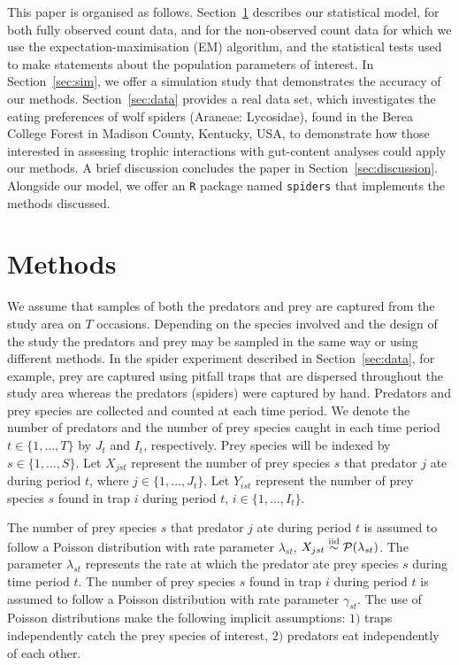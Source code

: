 \documentclass[12pt]{article}
\begin{document}
This paper is organised as follows.  Section~\ref{sec:methods} describes our statistical model, for both fully observed count data, and for the non-observed count data for which we use the expectation-maximisation (EM) algorithm, and the statistical tests used to make statements about the population parameters of interest.  In Section~\ref{sec:sim}, we offer a simulation study that demonstrates the accuracy of our methods.  Section~\ref{sec:data} provides a real data set, which investigates the eating preferences of wolf spiders (Araneae: Lycosidae), found in the Berea College Forest in Madison County, Kentucky, USA, to demonstrate how those interested in assessing trophic interactions with gut-content analyses could apply our methods.  A brief discussion concludes the paper in Section~\ref{sec:discussion}.  Alongside our model, we offer an \texttt{R} \citep{Core-Team:2014} package named \texttt{spiders} that implements the methods discussed.  

\section{Methods}
\label{sec:methods}

We assume that samples of both the predators and prey are captured from the study area on $T$ occasions.  Depending on the species involved and the design of the study the predators and prey may be sampled in the same way or using different methods.  In the spider experiment described in Section~\ref{sec:data}, for example, prey are captured using pitfall traps that are dispersed throughout the study area whereas the predators (spiders) were captured by hand.  Predators and prey species are collected and counted at each time period.  We denote the number of predators and the number of prey species caught in each time period $t \in \{1, \ldots, T\}$ by $J_t$ and $I_t$, respectively.  Prey species will be indexed by $s \in \{1, \ldots, S \}$.  Let $X_{jst}$ represent the number of prey species $s$ that predator $j$ ate during period $t$, where $j \in \{1, \ldots, J_t\}$.  Let $Y_{ist}$ represent the number of prey species $s$ found in trap $i$ during period $t$, $i \in \{1, \ldots, I_t\}$.

The number of prey species $s$ that predator $j$ ate during period $t$ is assumed to follow a Poisson distribution with rate parameter $\lambda_{st}$, $X_{jst} \stackrel{\mathrm{iid}}{\sim} \mathcal{P}(\lambda_{st})$.  The parameter $\lambda_{st}$ represents the rate at which the predator ate prey species $s$ during time period $t$.  The number of prey species $s$ found in trap $i$ during period $t$ is assumed to follow a Poisson distribution with rate parameter $\gamma_{st}$.  The use of Poisson distributions make the following implicit assumptions: $1)$ traps independently catch the prey species of interest, $2)$ predators eat independently of each other.  
\end{document}
